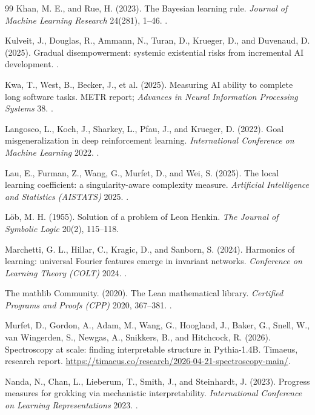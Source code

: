 \begin{thebibliography}{99}
 Khan, M. E., and Rue, H. (2023). The Bayesian learning rule. \emph{Journal of Machine Learning Research} 24(281), 1--46. .

 Kulveit, J., Douglas, R., Ammann, N., Turan, D., Krueger, D., and Duvenaud, D. (2025). Gradual disempowerment: systemic existential risks from incremental AI development. .






 Kwa, T., West, B., Becker, J., et al. (2025). Measuring AI ability to complete long software tasks. METR report; \emph{Advances in Neural Information Processing Systems} 38. .

 Langosco, L., Koch, J., Sharkey, L., Pfau, J., and Krueger, D. (2022). Goal misgeneralization in deep reinforcement learning. \emph{International Conference on Machine Learning} 2022. .

 Lau, E., Furman, Z., Wang, G., Murfet, D., and Wei, S. (2025). The local learning coefficient: a singularity-aware complexity measure. \emph{Artificial Intelligence and Statistics (AISTATS)} 2025. .


 L\"ob, M. H. (1955). Solution of a problem of Leon Henkin. \emph{The Journal of Symbolic Logic} 20(2), 115--118.



 Marchetti, G. L., Hillar, C., Kragic, D., and Sanborn, S. (2024). Harmonics of learning: universal Fourier features emerge in invariant networks. \emph{Conference on Learning Theory (COLT)} 2024. .

 The mathlib Community. (2020). The Lean mathematical library. \emph{Certified Programs and Proofs (CPP)} 2020, 367--381. .

 Murfet, D., Gordon, A., Adam, M., Wang, G., Hoogland, J., Baker, G., Snell, W., van Wingerden, S., Newgas, A., Snikkers, B., and Hitchcock, R. (2026). Spectroscopy at scale: finding interpretable structure in Pythia-1.4B. Timaeus, research report. \url{https://timaeus.co/research/2026-04-21-spectroscopy-main/}.

 Nanda, N., Chan, L., Lieberum, T., Smith, J., and Steinhardt, J. (2023). Progress measures for grokking via mechanistic interpretability. \emph{International Conference on Learning Representations} 2023. .


\end{thebibliography}
